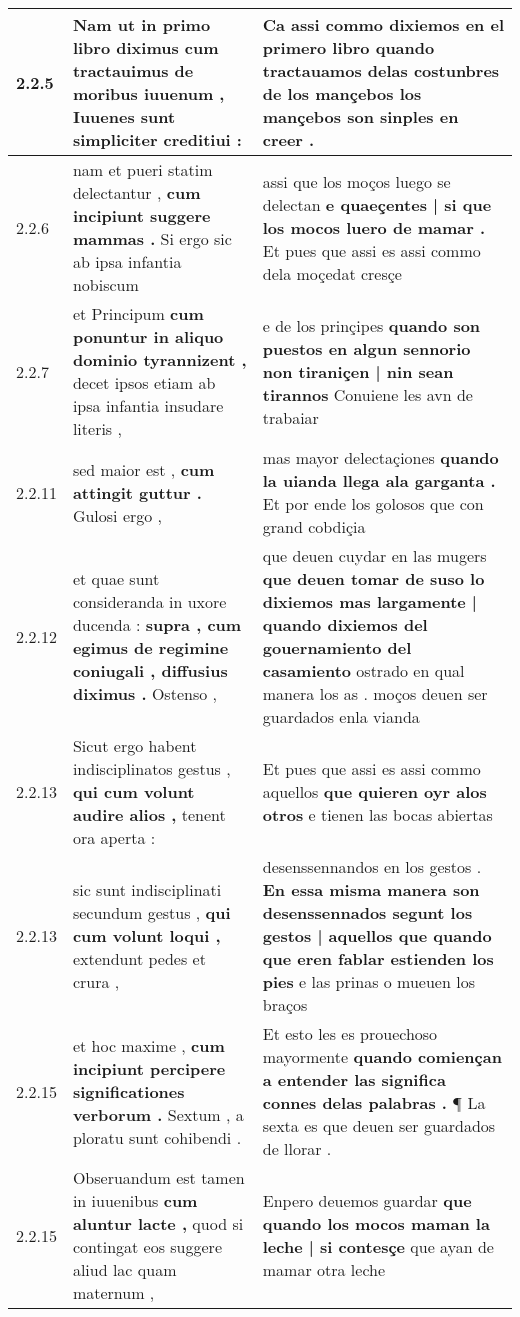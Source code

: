\begin{tabular}{|p{1cm}|p{6.5cm}|p{6.5cm}|}
2.2.5 & Nam ut in primo libro diximus \textbf{ cum tractauimus de moribus iuuenum , } Iuuenes sunt simpliciter creditiui : & Ca assi commo dixiemos en el primero libro \textbf{ quando tractauamos delas costunbres de los mançebos } los mançebos son sinples en creer . \\\hline
2.2.6 & nam et pueri statim delectantur , \textbf{ cum incipiunt suggere mammas . } Si ergo sic ab ipsa infantia nobiscum & assi que los moços luego se delectan \textbf{ e quaeçentes | si que los mocos luero de mamar . } Et pues que assi es assi commo dela moçedat cresçe \\\hline
2.2.7 & et Principum \textbf{ cum ponuntur in aliquo dominio tyrannizent , } decet ipsos etiam ab ipsa infantia insudare literis , & e de los prinçipes \textbf{ quando son puestos en algun sennorio non tiraniçen | nin sean tirannos } Conuiene les avn de trabaiar \\\hline
2.2.11 & sed maior est , \textbf{ cum attingit guttur . } Gulosi ergo , & mas mayor delectaçiones \textbf{ quando la uianda llega ala garganta . } Et por ende los golosos que con grand cobdiçia \\\hline
2.2.12 & et quae sunt consideranda in uxore ducenda : \textbf{ supra , cum egimus de regimine coniugali , diffusius diximus . } Ostenso , & que deuen cuydar en las mugers \textbf{ que deuen tomar de suso lo dixiemos mas largamente | quando dixiemos del gouernamiento del casamiento } ostrado en qual manera los as . moços deuen ser guardados enla vianda \\\hline
2.2.13 & Sicut ergo habent indisciplinatos gestus , \textbf{ qui cum volunt audire alios , } tenent ora aperta : & Et pues que assi es assi commo aquellos \textbf{ que quieren oyr alos otros } e tienen las bocas abiertas \\\hline
2.2.13 & sic sunt indisciplinati secundum gestus , \textbf{ qui cum volunt loqui , } extendunt pedes et crura , & desenssennandos en los gestos . \textbf{ En essa misma manera son desenssennados segunt los gestos | aquellos que quando que eren fablar estienden los pies } e las prinas o mueuen los braços \\\hline
2.2.15 & et hoc maxime , \textbf{ cum incipiunt percipere significationes verborum . } Sextum , a ploratu sunt cohibendi . & Et esto les es prouechoso mayormente \textbf{ quando comiençan a entender las significa connes delas palabras . } ¶ La sexta es que deuen ser guardados de llorar . \\\hline
2.2.15 & Obseruandum est tamen in iuuenibus \textbf{ cum aluntur lacte , } quod si contingat eos suggere aliud lac quam maternum , & Enpero deuemos guardar \textbf{ que quando los mocos maman la leche | si contesçe } que ayan de mamar otra leche \\\hline

\end{tabular}
